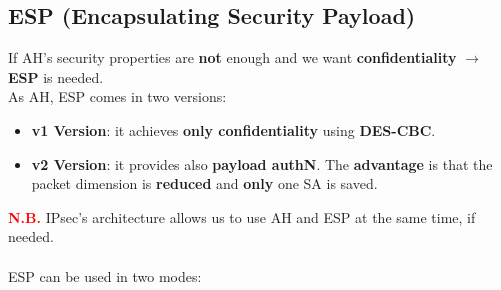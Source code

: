 \subsection{ESP (Encapsulating Security Payload)}
If AH’s security properties are \textbf{not} enough and we want \textbf{confidentiality} \(\rightarrow \) \textbf{ESP} is needed.\\
As AH, ESP comes in two versions:
\begin{itemize}
    \item \textbf{v1 Version}: it achieves \textbf{only confidentiality} using \textbf{DES-CBC}.
    \item \textbf{v2 Version}: it provides also \textbf{payload authN}. The \textbf{advantage} is that the packet dimension is \textbf{reduced} and \textbf{only} one SA is saved.
\end{itemize}
\textcolor{red}{\textbf{N.B.}}  IPsec’s architecture allows us to use AH and ESP at the same time, if needed.
\\
\\
ESP can be used in two modes:
